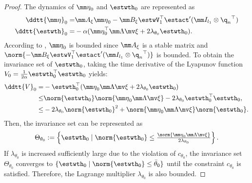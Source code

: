 \documentclass[letterpaper, 10 pt, conference]{ieeeconf}  %
\begin{document}
\begin{proof}
The dynamics of ${\mm \eta}_0$ and ${\estwth}_0$ are represented as
\begin{equation}
    \begin{aligned}     
        \ddtt{\mm \eta}_0 =& 
        \mm A_\xi{\mm \eta}_0 -\mm B_\xi 
        \estwV_1^\top \estact'(\mm I_{l_1}\otimes {\q_{n}}^\top )
        \\
        \ddtt{{\estwth}}_0
        =&
        -\alpha 
        (
            {\mm \eta}_0^\top \mm \Lambda\mv \xi+2\lambda_{\theta_0} {\estwth}_0
        )
        .
    \end{aligned}
\end{equation}
According to \cite[Chap.~4 T.~1.9]{Desoer:2009aa}, ${\mm \eta}_0$ is bounded since $\mm A_\xi$ is a stable matrix and $\norm{-\mm B_\xi\estwV_1^\top \estact'(\mm I_{l_1}\otimes {\q_{n}}^\top )}$ is bounded.
To obtain the invariance set of ${\estwth}_0$, taking the time derivative of the Lyapunov function $V_0=\tfrac{1}{2\alpha}{\estwth}_0^\top {\estwth}_0$ yields:
\begin{equation}
    \begin{aligned}
        \ddtt {V}_0 =& 
        -{\estwth}_0^\top (
            {\mm \eta}_0\mm \Lambda\mv \xi 
            +2\lambda_{\theta_0}{\estwth}_0
        )
        \\
        \le &
        \norm{{\estwth}_0} \norm{{\mm \eta}_0\mm \Lambda\mv \xi} 
        -
        2\lambda_{\theta_0} {\estwth}_0^\top {\estwth}_0
        ,
        \\
        \le &
        -2\lambda_{\theta_0} 
        \norm{{\estwth}_0}^2 
        + 
        \norm{{\mm \eta}_0\mm \Lambda\mv \xi}
        \norm{{\estwth}_0}
        .
    \end{aligned}
\end{equation}
Then, the invariance set can be represented as 
\begin{equation}
    \Theta_{{\theta}_0} :=
    \left\{
        {\estwth}_0\mid\norm{\estwth_0}
        \le
        \tfrac{
            \norm{{\mm \eta}_0\mm \Lambda\mv \xi}
        }{
            2\lambda_{\theta_0}
        }
    \right\}
    .    
\end{equation}
If $\lambda_{\theta_0}$ is increased sufficiently large due to the violation of $c_{\theta_0}$, the invariance set $\Theta_{{\theta}_0}$ converges to $\{{\estwth}_0 \mid \norm{{\estwth}_0} \le \bar\theta_0\}$ until the constraint $c_{\theta_0}$ is satisfied.
Therefore, the Lagrange multiplier $\lambda_{\theta_0}$ is also bounded.

\end{proof}
\end{document}
